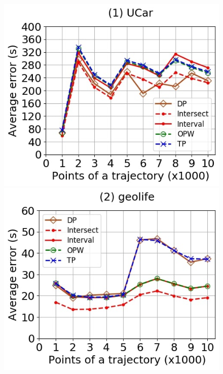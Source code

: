 {\begin{figure}[tb!]
	\centering
	\includegraphics[scale=0.250]{Figures/Exp-when-DAD-error-size-service.jpg}	\hspace{0.5ex}
	\includegraphics[scale=0.250]{Figures/Exp-when-DAD-error-size-geolife.jpg}	\hspace{0.5ex}

\end{figure}}
